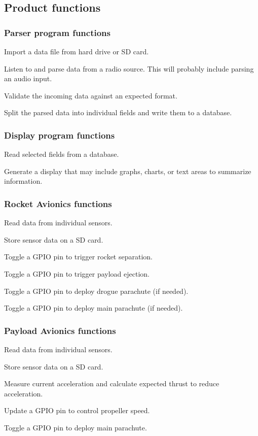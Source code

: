 \documentclass[onecolumn, draftclsnofoot, 10pt, compsoc]{IEEEtran}
\begin{document}
\subsection{Product functions}
\subsubsection{Parser program functions}
Import a data file from hard drive or SD card.

Listen to and parse data from a radio source.  This will probably include parsing an audio input.

Validate the incoming data against an expected format.

Split the parsed data into individual fields and write them to a database.

\subsubsection{Display program functions}
Read selected fields from a database.

Generate a display that may include graphs, charts, or text areas to summarize information.

\subsubsection{Rocket Avionics functions}
Read data from individual sensors.

Store sensor data on a SD card.

Toggle a GPIO pin to trigger rocket separation.

Toggle a GPIO pin to trigger payload ejection.

Toggle a GPIO pin to deploy drogue parachute (if needed).

Toggle a GPIO pin to deploy main parachute (if needed).

\subsubsection{Payload Avionics functions}
Read data from individual sensors.

Store sensor data on a SD card.

Measure current acceleration and calculate expected thrust to reduce acceleration.

Update a GPIO pin to control propeller speed.

Toggle a GPIO pin to deploy main parachute.
\end{document}
